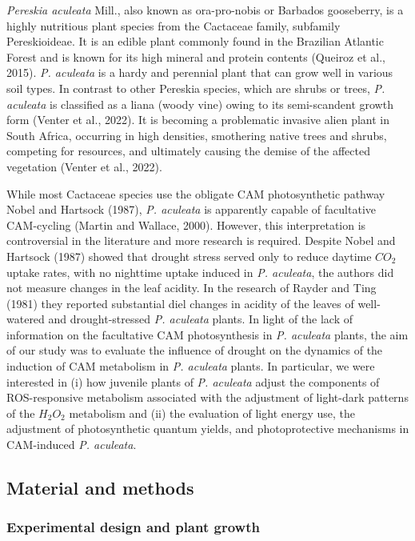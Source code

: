 \documentclass[
  12pt,
  letterpaper,
  DIV=11,
  numbers=noendperiod]{scrartcl}
\begin{document}
\emph{Pereskia aculeata} Mill., also known as ora-pro-nobis or Barbados
gooseberry, is a highly nutritious plant species from the Cactaceae
family, subfamily Pereskioideae. It is an edible plant commonly found in
the Brazilian Atlantic Forest and is known for its high mineral and
protein contents (Queiroz et al., 2015). \emph{P. aculeata} is a hardy
and perennial plant that can grow well in various soil types. In
contrast to other Pereskia species, which are shrubs or trees, \emph{P.
aculeata} is classified as a liana (woody vine) owing to its
semi-scandent growth form (Venter et al., 2022). It is becoming a
problematic invasive alien plant in South Africa, occurring in high
densities, smothering native trees and shrubs, competing for resources,
and ultimately causing the demise of the affected vegetation (Venter et
al., 2022).

While most Cactaceae species use the obligate CAM photosynthetic pathway
Nobel and Hartsock (1987), \emph{P. aculeata} is apparently capable of
facultative CAM-cycling (Martin and Wallace, 2000). However, this
interpretation is controversial in the literature and more research is
required. Despite Nobel and Hartsock (1987) showed that drought stress
served only to reduce daytime \(CO_2\) uptake rates, with no nighttime
uptake induced in \emph{P. aculeata}, the authors did not measure
changes in the leaf acidity. In the research of Rayder and Ting (1981)
they reported substantial diel changes in acidity of the leaves of
well-watered and drought-stressed \emph{P. aculeata} plants. In light of
the lack of information on the facultative CAM photosynthesis in
\emph{P. aculeata} plants, the aim of our study was to evaluate the
influence of drought on the dynamics of the induction of CAM metabolism
in \emph{P. aculeata} plants. In particular, we were interested in (i)
how juvenile plants of \emph{P. aculeata} adjust the components of
ROS-responsive metabolism associated with the adjustment of light-dark
patterns of the \(H_2O_2\) metabolism and (ii) the evaluation of light
energy use, the adjustment of photosynthetic quantum yields, and
photoprotective mechanisms in CAM-induced \emph{P. aculeata}.

\hypertarget{material-and-methods}{%
\subsection{Material and methods}\label{material-and-methods}}

\hypertarget{experimental-design-and-plant-growth}{%
\subsubsection{Experimental design and plant
growth}\label{experimental-design-and-plant-growth}}
\end{document}
